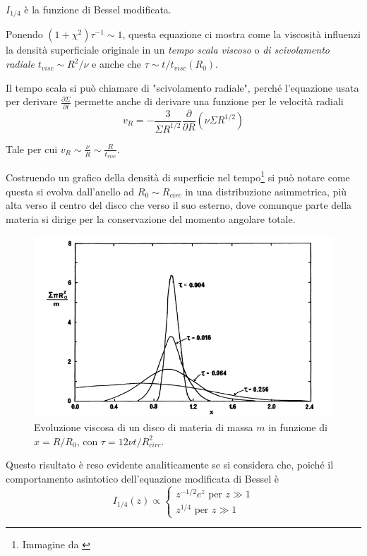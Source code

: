 \documentclass[a4paperbi]{article}
\begin{document}
	$I_{1/4}$ è la funzione di Bessel modificata.
	
	Ponendo $(1+\chi^2)\tau^{-1}\sim 1$, questa equazione ci mostra come la viscosità influenzi la densità superficiale originale in un \textit{tempo scala viscoso} o \textit{di scivolamento radiale} $t_{visc}\sim R^2/\nu$ e anche che $\tau\sim t/t_{visc}(R_0)$.
	
	Il tempo scala si può chiamare di "scivolamento radiale", perché l'equazione usata per derivare $\frac{\partial\Sigma}{\partial t}$ permette anche di derivare una funzione per le velocità radiali
	\begin{equation}
		v_R=-\frac{3}{\Sigma R^{1/2}}\frac{\partial}{\partial R}(\nu\Sigma R^{1/2})
	\end{equation}
	
	Tale per cui $v_R\sim\frac{\nu}{R}\sim\frac{R}{t_{visc}}$.
	
	Costruendo un grafico della densità di superficie nel tempo\footnote{Immagine da \cite{Pringle1981}} si può notare come questa si evolva dall'anello ad $R_0\sim R_{circ}$ in una distribuzione asimmetrica, più alta verso il centro del disco che verso il suo esterno, dove comunque parte della materia si dirige per la conservazione del momento angolare totale.
	
	\begin{figure}[H]
		\centering
		\includegraphics[width=0.7\linewidth]{DensSuper}
		\caption{Evoluzione viscosa di un disco di materia di massa $m$ in funzione di $x=R/R_0$, con $\tau=12\nu t/R_{circ}^2$.}
		\label{fig:denssuper}
	\end{figure}

	Questo risultato è reso evidente analiticamente se si considera che, poiché il comportamento asintotico dell'equazione modificata di Bessel è
	\begin{equation*}
		I_{1/4}(z)\propto\begin{cases}
				z^{-1/2}e^z\text{ per $z\gg1$}\\
				z^{1/4}\text{ per $z\gg1$}
			\end{cases}
	\end{equation*}
	 
\end{document}
